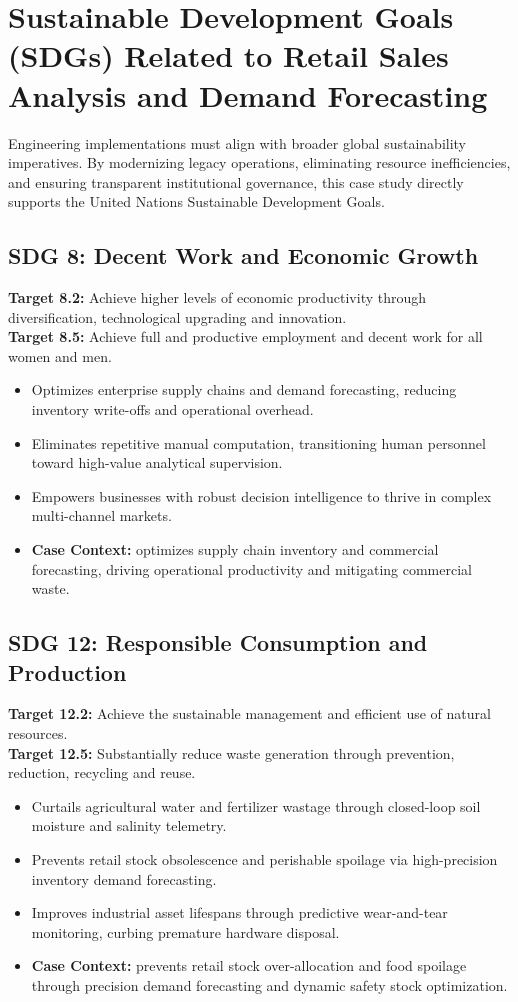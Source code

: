 \section{Sustainable Development Goals (SDGs) Related to Retail Sales Analysis and Demand Forecasting}
Engineering implementations must align with broader global sustainability imperatives. By modernizing legacy operations, eliminating resource inefficiencies, and ensuring transparent institutional governance, this case study directly supports the United Nations Sustainable Development Goals.

\subsection{SDG 8: Decent Work and Economic Growth}
\noindent\textbf{Target 8.2:} Achieve higher levels of economic productivity through diversification, technological upgrading and innovation. \\
\noindent\textbf{Target 8.5:} Achieve full and productive employment and decent work for all women and men.
\begin{itemize}
  \item Optimizes enterprise supply chains and demand forecasting, reducing inventory write-offs and operational overhead.
  \item Eliminates repetitive manual computation, transitioning human personnel toward high-value analytical supervision.
  \item Empowers businesses with robust decision intelligence to thrive in complex multi-channel markets.
  \item \textbf{Case Context:} optimizes supply chain inventory and commercial forecasting, driving operational productivity and mitigating commercial waste.
\end{itemize}

\subsection{SDG 12: Responsible Consumption and Production}
\noindent\textbf{Target 12.2:} Achieve the sustainable management and efficient use of natural resources. \\
\noindent\textbf{Target 12.5:} Substantially reduce waste generation through prevention, reduction, recycling and reuse.
\begin{itemize}
  \item Curtails agricultural water and fertilizer wastage through closed-loop soil moisture and salinity telemetry.
  \item Prevents retail stock obsolescence and perishable spoilage via high-precision inventory demand forecasting.
  \item Improves industrial asset lifespans through predictive wear-and-tear monitoring, curbing premature hardware disposal.
  \item \textbf{Case Context:} prevents retail stock over-allocation and food spoilage through precision demand forecasting and dynamic safety stock optimization.
\end{itemize}
